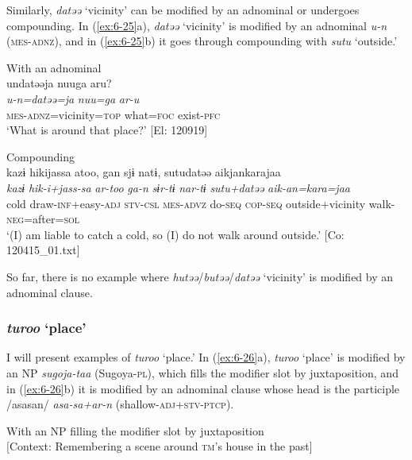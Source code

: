 Similarly, \textit{datəə} ‘vicinity’ can be modified by an adnominal or undergoes compounding. In (\ref{ex:6-25}a), \textit{datəə} ‘vicinity’ is modified by an adnominal \textit{u-n} (\textsc{mes}-\textsc{adnz}), and in (\ref{ex:6-25}b) it goes through compounding with \textit{sutu} ‘outside.’

\ea\label{ex:6-25}
\ea With an adnominal\\
{\TM}
\glll  undatəəja  nuuga  aru?\\
\textit{u-n=datəə=ja}  \textit{nuu=ga}  \textit{ar-u}\\
\textsc{mes}-\textsc{adnz}=vicinity=\textsc{top}  what=\textsc{foc}  exist-\textsc{pfc}\\
\glt ‘What is around that place?’ [El: 120919]

\ex Compounding\\
{\TM}
\glll  kazɨ  hikijassa  atoo,  gan  sjɨ  natɨ,      sutudatəə  aikjankarajaa\\
\textit{kazɨ}  \textit{hik-i+jass-sa}  \textit{ar-too}  \textit{ga-n}  \textit{sɨr-tɨ}  \textit{nar-tɨ}  \textit{sutu+datəə}  \textit{aik-an=kara=jaa}\\
cold  draw-\textsc{inf}+easy-\textsc{adj}  \textsc{stv}-\textsc{csl}  \textsc{mes}-\textsc{advz}  do-\textsc{seq}  \textsc{cop}-\textsc{seq}   outside+vicinity  walk-\textsc{neg}=after=\textsc{sol}\\
\glt ‘(I) am liable to catch a cold, so (I) do not walk around outside.’ [Co: 120415\_01.txt]
\z

So far, there is no example where \textit{hutəə}/\textit{butəə}/\textit{datəə} ‘vicinity’ is modified by an adnominal clause.

\subsubsection{ \textit{turoo} ‘place’}

I will present examples of \textit{turoo} ‘place.’ In (\ref{ex:6-26}a), \textit{turoo} ‘place’ is modified by an NP \textit{sugoja-taa} (Sugoya-\textsc{pl}), which fills the modifier slot by juxtaposition, and in (\ref{ex:6-26}b) it is modified by an adnominal clause whose head is the participle /asasan/ \textit{asa-sa+ar-n} (shallow-\textsc{adj}+\textsc{stv}-\textsc{ptcp}).

\ea\label{ex:6-26}
\ea With an NP filling the modifier slot by juxtaposition\\{}
[Context: Remembering a scene around \textsc{tm}’s house in the past]

